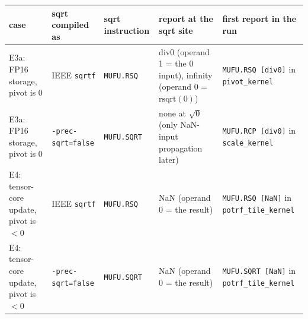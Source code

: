 \begin{tabular}{p{2.5cm}p{2.3cm}p{1.6cm}p{4.0cm}p{3.6cm}}
\toprule
case & sqrt compiled as & sqrt instruction & report at the sqrt site & first report in the run\\
\midrule
E3a: FP16 storage, pivot is $0$ & IEEE \texttt{sqrtf} & \texttt{MUFU.RSQ} & div0 (operand 1 = the $0$ input), infinity (operand 0 = $\mathrm{rsqrt}(0)$) & \texttt{MUFU.RSQ [div0]} in \texttt{pivot\_kernel}\\
E3a: FP16 storage, pivot is $0$ & \texttt{-prec-sqrt=false} & \texttt{MUFU.SQRT} & none at $\sqrt0$ (only NaN-input propagation later) & \texttt{MUFU.RCP [div0]} in \texttt{scale\_kernel}\\
E4: tensor-core update, pivot is $<0$ & IEEE \texttt{sqrtf} & \texttt{MUFU.RSQ} & NaN (operand 0 = the result) & \texttt{MUFU.RSQ [NaN]} in \texttt{potrf\_tile\_kernel}\\
E4: tensor-core update, pivot is $<0$ & \texttt{-prec-sqrt=false} & \texttt{MUFU.SQRT} & NaN (operand 0 = the result) & \texttt{MUFU.SQRT [NaN]} in \texttt{potrf\_tile\_kernel}\\
\bottomrule
\end{tabular}
